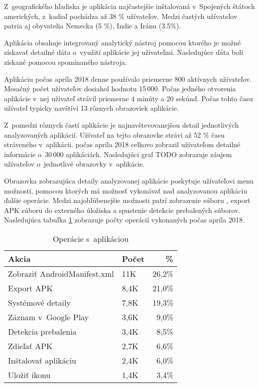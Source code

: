 Z~geografického hľadiska je aplikácia najčastejšie inštalovaná v~Spojených štátoch amerických, z~kadiaľ pochádza až 38 \% užívateľov. Medzi častých užívateľov patria aj obyvatelia Nemecka (5 \%), Indie a Iránu (3.5\%). 

Aplikácia obsahuje integrovaný analytický nástroj  pomocou ktorého je možné získavať detailné dáta o~využití aplikácie jej užívateľmi. Nasledujúce dáta boli získané pomocou spomínaného nástroja.

Aplikáciu počas apríla 2018 denne používalo priemerne 800 aktívnych užívateľov. Mesačný počet užívateľov dosiahol hodnotu 15\,000. Počas jedného otvorenia aplikácie v~nej užívateľ strávil priemerne 4 minúty a 20 sekúnd. Počas tohto času užívateľ typicky navštívi 13 rôznych obrazoviek aplikácie. 

Z~pomedzi rôznych častí aplikácie je najnavštevovanejšou detail jednotlivých analyzovaných aplikácií. Užívateľ na tejto obrazovke strávi až 52 \% času stráveného v~aplikácii.  počas apríla 2018 celkovo zobrazil užívateľom detailné informácie o~30\,000 aplikáciách.  Nasledujúci graf TODO zobrazuje záujem užívateľov o~jednotlivé obrazovky v~aplikácie.

Obrazovka zobrazujúca detaily analyzovanej aplikácie poskytuje užívateľovi menu možností, pomocou ktorých má možnosť vykonávať nad analyzovanou aplikáciu ďalšie operácie. Medzi najobľúbenejšie možnosti patrí zobrazenie súboru , export APK súboru do externého úložiska a spustenie detekcie prebalených súborov.  Nasledujúca tabuľka \ref{app-ops} zobrazuje počty operácií vykonaných počas apríla 2018.

\begin{table}[]
\centering
\begin{tabular}{|l|l|r|}
\hline
\textbf{Akcia}                        & \textbf{Počet} & \textbf{\%}    \\ \hline
Zobraziť AndroidManifest.xml & 11K  & 26,2\% \\
Export APK                   & 8,4K  & 21,0\% \\
Systémové detaily            & 7,8K  & 19,3\% \\
Záznam v~Google Play         & 3,6K  & 9,0\% \\
Detekcia prebalenia          & 3,4K  & 8,5\%  \\
Zdieľať APK                  & 2,7K   & 6,6\%  \\
Inštalovať aplikáciu         & 2,4K   & 6,0\%  \\
Uložiť ikonu                 & 1,4K   & 3,4\%  \\ \hline
\end{tabular}
\caption{Operácie s~aplikáciou}
\label{app-ops}
\end{table}



